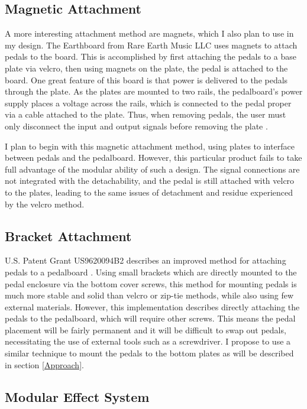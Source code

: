 \documentclass{article}
\begin{document}
\subsection{Magnetic Attachment}

A more interesting attachment method are magnets, which I also plan to use in my design.  The Earthboard from Rare Earth Music LLC uses magnets to attach pedals to the board.  This is accomplished by first attaching the pedals to a base plate via velcro, then using magnets on the plate, the pedal is attached to the board.  One great feature of this board is that power is delivered to the pedals through the plate.  As the plates are mounted to two rails, the pedalboard's power supply places a voltage across the rails, which is connected to the pedal proper via a cable attached to the plate.  Thus, when removing pedals, the user must only disconnect the input and output signals before removing the plate \cite{EARTHBOARDSITE}.

I plan to begin with this magnetic attachment method, using plates to interface between pedals and the pedalboard.  However, this particular product fails to take full advantage of the modular ability of such a design.  The signal connections are not integrated with the detachability, and the pedal is still attached with velcro to the plates, leading to the same issues of detachment and residue experienced by the velcro method.

\subsection{Bracket Attachment}

U.S. Patent Grant US9620094B2 describes an improved method for attaching pedals to a pedalboard \cite{ABBATE:2016}.  Using small brackets which are directly mounted to the pedal enclosure via the bottom cover screws, this method for mounting pedals is much more stable and solid than velcro or zip-tie methods, while also using few external materials.  However, this implementation describes directly attaching the pedals to the pedalboard, which will require other screws.  This means the pedal placement will be fairly permanent and it will be difficult to swap out pedals, necessitating the use of external tools such as a screwdriver.  I propose to use a similar technique to mount the pedals to the bottom plates as will be described in section \ref{Approach}.

\subsection{Modular Effect System}
\end{document}
